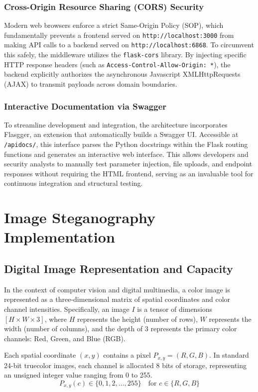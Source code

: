 \documentclass[12pt,a4paper]{report}
\begin{document}
\subsection{Cross-Origin Resource Sharing (CORS) Security}
Modern web browsers enforce a strict Same-Origin Policy (SOP), which fundamentally prevents a frontend served on \texttt{http://localhost:3000} from making API calls to a backend served on \texttt{http://localhost:6868}. To circumvent this safely, the middleware utilizes the \texttt{flask-cors} library. 
By injecting specific HTTP response headers (such as \texttt{Access-Control-Allow-Origin: *}), the backend explicitly authorizes the asynchronous Javascript XMLHttpRequests (AJAX) to transmit payloads across domain boundaries.

\subsection{Interactive Documentation via Swagger}
To streamline development and integration, the architecture incorporates Flasgger, an extension that automatically builds a Swagger UI. Accessible at \texttt{/apidocs/}, this interface parses the Python docstrings within the Flask routing functions and generates an interactive web interface. This allows developers and security analysts to manually test parameter injection, file uploads, and endpoint responses without requiring the HTML frontend, serving as an invaluable tool for continuous integration and structural testing.
\chapter{Image Steganography Implementation}

\section{Digital Image Representation and Capacity}
In the context of computer vision and digital multimedia, a color image is represented as a three-dimensional matrix of spatial coordinates and color channel intensities. Specifically, an image $I$ is a tensor of dimensions $[H \times W \times 3]$, where $H$ represents the height (number of rows), $W$ represents the width (number of columns), and the depth of 3 represents the primary color channels: Red, Green, and Blue (RGB).

Each spatial coordinate $(x, y)$ contains a pixel $P_{x,y} = (R, G, B)$. In standard 24-bit truecolor images, each channel is allocated 8 bits of storage, representing an unsigned integer value ranging from 0 to 255. 
$$ P_{x,y}(c) \in \{0, 1, 2, \dots, 255\} \quad \text{for } c \in \{R, G, B\} $$
\end{document}
